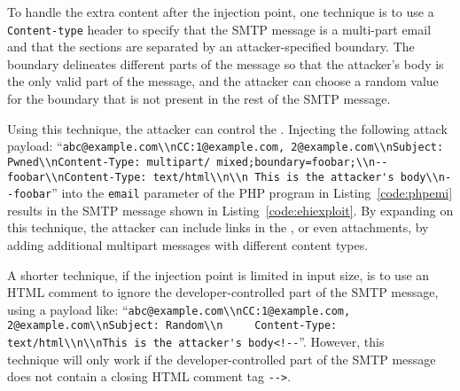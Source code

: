 To handle the extra content after the injection point, one technique
is to use a \lstinline{Content-type} header to specify that the SMTP
message is a multi-part email and that the sections are separated by
an attacker-specified boundary. The boundary delineates different
parts of the message so that the attacker's body is the only valid
part of the message, and the attacker can choose a random value for
the boundary that is not present in the rest of the SMTP message.

Using this technique, the attacker can control the \email.
Injecting the following attack payload:
``\texttt{\lstinline{abc@example.com\\nCC:1@example.com, 2@example.com\\nSubject: Pwned\\nContent-Type: multipart/ mixed;boundary=foobar;\\n--foobar\\nContent-Type: text/html\\n\\n This is the attacker's body\\n--foobar}}'' into the \lstinline{email} parameter
of the PHP program in Listing~\ref{code:phpemi} results in
the SMTP message shown in Listing~\ref{code:ehiexploit}.
By expanding on this technique, the attacker can include links in the
\email, or even attachments, by adding additional multipart messages
with different content types.

A shorter technique, if the injection point is limited in input
size, is to use an HTML comment to ignore the developer-controlled
part of the SMTP message, using a payload like:
``\texttt{\lstinline{abc@example.com\\nCC:1@example.com, 2@example.com\\nSubject: Random\\n
    Content-Type: text/html\\n\\nThis is the attacker's body<!--}}''. However, this \\technique will only work if the developer-controlled part of the SMTP
message does not contain a closing HTML comment tag
\texttt{\lstinline{-->}}.


